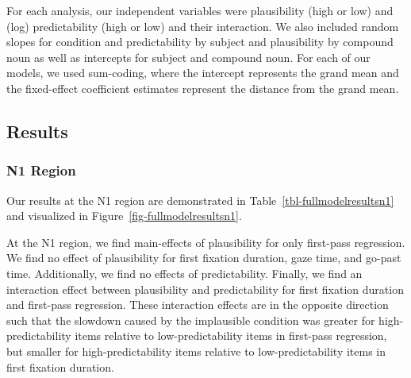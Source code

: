 \documentclass[
  12pt,
  letterpaper,
]{scrreprt}
\begin{document}
For each analysis, our independent variables were plausibility (high or
low) and (log) predictability (high or low) and their interaction. We
also included random slopes for condition and predictability by subject
and plausibility by compound noun as well as intercepts for subject and
compound noun. For each of our models, we used sum-coding, where the
intercept represents the grand mean and the fixed-effect coefficient
estimates represent the distance from the grand mean.

\subsection{Results}\label{results-3}

\subsubsection{N1 Region}\label{n1-region-1}

Our results at the N1 region are demonstrated in
Table~\ref{tbl-fullmodelresultsn1} and visualized in
Figure~\ref{fig-fullmodelresultsn1}.

At the N1 region, we find main-effects of plausibility for only
first-pass regression. We find no effect of plausibility for first
fixation duration, gaze time, and go-past time. Additionally, we find no
effects of predictability. Finally, we find an interaction effect
between plausibility and predictability for first fixation duration and
first-pass regression. These interaction effects are in the opposite
direction such that the slowdown caused by the implausible condition was
greater for high-predictability items relative to low-predictability
items in first-pass regression, but smaller for high-predictability
items relative to low-predictability items in first fixation duration.
\end{document}
